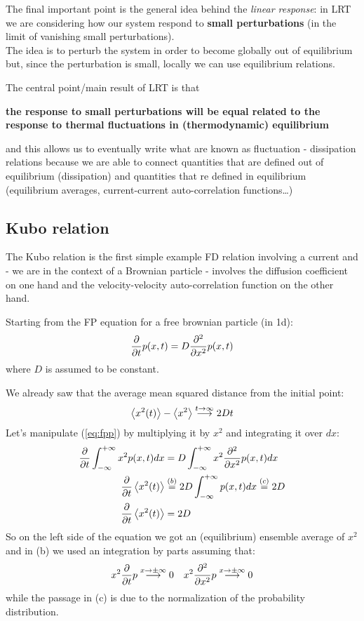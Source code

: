 \documentclass[\main/main.tex]{subfiles}
\begin{document}
The final important point is the general idea behind the \textit{linear response}: in LRT we are considering how our system respond to \textbf{small perturbations} (in the limit of vanishing small perturbations). \\

The idea is to perturb the system in order to become globally out of equilibrium but, since the perturbation is small, locally we can use equilibrium relations.

The central point/main result of LRT is that
\begin{center}
\textbf{the response to small perturbations will be equal related to the response to thermal fluctuations in (thermodynamic) equilibrium} 
\end{center}
and this allows us to eventually write what are known as fluctuation - dissipation relations because we are able to connect quantities that are defined out of equilibrium (dissipation) and quantities that re defined in equilibrium (equilibrium averages, current-current auto-correlation functions\dots)

\subsection{Kubo relation}
The Kubo relation is the first simple example FD relation involving a current and - we are in the context of a Brownian particle -  involves the diffusion coefficient on one hand and the velocity-velocity auto-correlation function on the other hand.

Starting from the FP equation for a free brownian particle (in 1d):
\begin{align}
    \frac{\partial}{\partial t}p(x,t)=D\frac{\partial^2}{\partial x ^2}p(x,t)
    \label{eq:fpp}
\end{align}
where $D$ is assumed to be constant. 

We already saw that the average mean squared distance from the initial point:
\begin{eqnarray}
    \left\langle x^2(t) \right\rangle-\left\langle x^2 \right\rangle \overset{t\to\infty}{\longrightarrow} 2Dt
\end{eqnarray}
Let's manipulate (\ref{eq:fpp}) by multiplying it by $x^2$ and integrating it over $dx$:
\begin{align}
   \frac{\partial}{\partial t}\int_{-\infty}^{+\infty}x^2p(x,t)dx &= D\int_{-\infty}^{+\infty}x^2\frac{\partial^2}{\partial x^2}p(x,t)dx \\
   \frac{\partial}{\partial t}\left\langle x^2(t) \right\rangle &\overset{(b)}{=} 2D\int_{-\infty}^{+\infty}p(x,t)dx \overset{(c)}{=}2D \\
   \frac{\partial}{\partial t}\left\langle x^2(t) \right\rangle &= 2D
   \label{eq:exact}
\end{align}
So on the left side of the equation we got an (equilibrium) ensemble average of $x^2$ and in (b) we used an integration by parts assuming that:
\begin{eqnarray}
    x^2\frac{\partial}{\partial t}p\overset{x\to\pm\infty}{\longrightarrow}0 \quad x^2\frac{\partial^2}{\partial x ^2}p \overset{x\to\pm\infty}{\longrightarrow}0 
\end{eqnarray}
while the passage in (c) is due to the normalization of the probability distribution.
\end{document}

